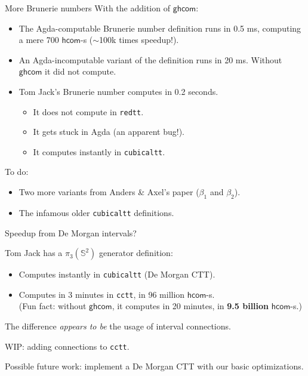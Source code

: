 \documentclass[dvipsnames]{beamer}
\newcommand{\ms}[1]{\mathsf{#1}}
\newcommand{\hcom}{\ms{hcom}}
\newcommand{\ghcom}{\ms{ghcom}}
\begin{document}
\begin{frame}{More Brunerie numbers}
With the addition of $\ghcom$:
\begin{itemize}
\item The Agda-computable Brunerie number definition runs in 0.5 ms, computing a
      mere 700 $\hcom$-s ($\sim$100k times speedup!).
\pause
\item An Agda-incomputable variant of the definition runs in 20 ms. Without $\ghcom$
      it did not compute.
\pause
\item Tom Jack's Brunerie number computes in 0.2 seconds.
     \begin{itemize}
       \item It does not compute in \texttt{redtt}.
       \item It gets stuck in Agda (an apparent bug!).
       \item It computes instantly in \texttt{cubicaltt}.
     \end{itemize}
\end{itemize}
\pause

To do:
\begin{itemize}
  \item Two more variants from Anders \& Axel's paper ($\beta_1$ and $\beta_2$).
  \item The infamous older \texttt{cubicaltt} definitions.
\end{itemize}

\end{frame}

\begin{frame}{Speedup from De Morgan intervals?}

Tom Jack has a $\pi_3(\mathbb{S}^2)$ generator definition:
\begin{itemize}
  \item Computes instantly in \texttt{cubicaltt} (De Morgan CTT).
  \item Computes in 3 minutes in \texttt{cctt}, in 96 million $\hcom$-s.\\
        (Fun fact: without $\ghcom$, it computes in 20 minutes, in
         \textbf{9.5 billion} $\hcom$-s.)
\end{itemize}
\vspace{1em}
\pause

The difference \emph{appears to be} the usage of interval connections.
\vspace{1em}

WIP: adding connections to \texttt{cctt}.
\vspace{1em}

Possible future work: implement a De Morgan CTT with our basic optimizations.

\end{frame}
\end{document}
